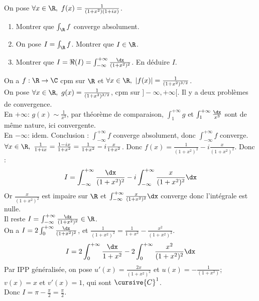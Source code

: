 \documentclass[11pt]{article}
\begin{document}
\begin{ex}{}{}
    On pose $\forall x \in \R, ~ f(x)=\frac{1}{(1+x^2)(1+ix)}$.
    \begin{enumerate}
        \item Montrer que $\int_\R f$ converge absolument.
        \item On pose $I=\int_\R f$. Montrer que $I\in\R$.
        \item Montrer que $I=\Re(I)=\int_{-\infty}^{+\infty}\frac{\dx}{(1+x^2)^2}$. En déduire $I$.
    \end{enumerate}
    \tcblower
     On a $f:\R\to\C$ cpm sur $\R$ et $\forall x \in \R, ~ |f(x)|=\frac{1}{(1+x^2)^{3/2}}$.\\
    On pose $\forall x \in \R, ~ g(x)=\frac{1}{(1+x^2)^{3/2}}$, cpm sur $]-\infty,+\infty[$. Il y a deux problèmes de convergence.\\
    En $+\infty$: $g(x)\sim\frac{1}{x^3}$, par théorème de comparaison, $\int_1^{+\infty}g$ et $\int_1^{+\infty}\frac{\dx}{x^3}$ sont de même nature, ici convergente.\\
    En $-\infty$: idem. Conclusion : $\int_{-\infty}^{+\infty}f$ converge absolument, donc $\int_{-\infty}^{+\infty}f$ converge.\\
     $\forall x \in \R, ~ \frac{1}{1+ix}=\frac{1-ix}{1+x^2}=\frac{1}{1+x^2}-i\frac{x}{1+x^2}$. Donc $f(x)=\frac{1}{(1+x^2)^2}-i\frac{x}{(1+x^2)^2}$. Donc :
    \begin{equation*}
        I=\int_{-\infty}^{+\infty}\frac{\dx}{(1+x^2)^2} - i\int_{-\infty}^{+\infty}\frac{x}{(1+x^2)^2}\dx
    \end{equation*}
    Or $\frac{x}{(1+x^2)^2}$ est impaire sur $\R$ et $\int_{-\infty}^{+\infty}\frac{x}{(1+x^2)^2}\dx$ converge donc l'intégrale est nulle.\\
    Il reste $I=\int_{-\infty}^{+\infty}\frac{\dx}{(1+x^2)^2}\in\R$.\\
     On a $I=2\int_0^{+\infty}\frac{\dx}{(1+x^2)^2}$, et $\frac{1}{(1+x^2)^2}=\frac{1}{1+x^2}-\frac{x^2}{(1+x^2)^2}$.
    \begin{equation*}
        I=2\int_0^{+\infty}\frac{\dx}{1+x^2}-2\int_0^{+\infty}\frac{x^2}{(1+x^2)^2}\dx
    \end{equation*}
    Par IPP généralisée, on pose $u'(x)=\frac{2x}{(1+x^2)^2}$ et $u(x)=-\frac{1}{(1+x^2)}$; $v(x)=x$ et $v'(x)=1$, qui sont $\cursive{C}^1$.\\
    Donc $I=\pi-\frac{\pi}{2}=\frac{\pi}{2}$.
\end{ex}
\end{document}
